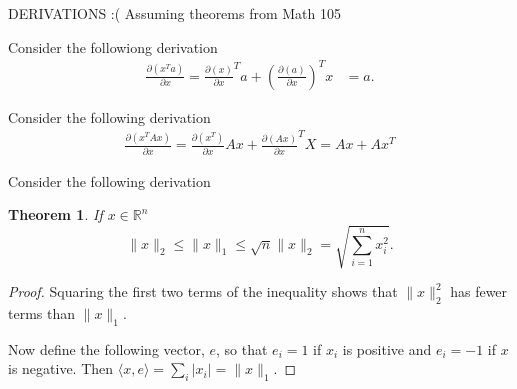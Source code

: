 \documentclass[letter]{article}
\newtheorem{theorem}{Theorem}
\newenvironment{menumerate}{%
  \edef\backupindent{\the\parindent}%
  \enumerate%
  \setlength{\parindent}{\backupindent}%
}{\endenumerate}
\begin{document}
\begin{menumerate}
  \newpage
  \item DERIVATIONS :( Assuming theorems from Math 105
  \begin{menumerate}
      \item Consider the followiong derivation
      \begin{equation}
        \begin{aligned}
          \frac{\partial(x^Ta)}{\partial x} = \frac{\partial (x)}{\partial x}^T a + \left(\frac{\partial (a)}{\partial x}\right)^T x
          &= a.
        \end{aligned}
       \end{equation}
       \item Consider the following derivation
       \begin{equation}
          \begin{aligned}
              \frac{\partial(x^TAx)}{\partial x} = \frac{\partial(x^T)}{\partial x} Ax + \frac{\partial(Ax)}{\partial x}^TX = Ax + Ax^T
          \end{aligned}
       \end{equation}
       \item Consider the following derivation
       \item
       \begin{theorem}
          If $x \in \mathbb{R}^n$ 
          \begin{equation}
            \|x\|_2 \leq \|x\|_1 \leq \sqrt{n}\|x\|_2 = \sqrt{\sum_{i=1}^n x_i^2}.
          \end{equation}
       \end{theorem}
       \begin{proof}
            Squaring the first two terms of the inequality shows that
            $\|x\|_2^2$ has fewer terms than $\|x\|_1.$ 

            Now define the following vector, $e$, so that $e_i = 1$ if
            $x_i$ is positive and $e_i = -1$ if $x$ is negative.
            Then $\langle x, e \rangle = \sum_i |x_i| = \|x\|_1.$


\end{proof}
\end{menumerate}
\end{menumerate}
\end{document}
